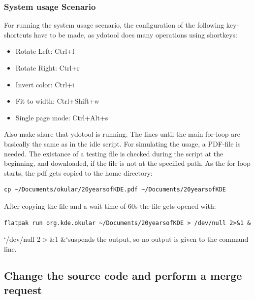     \subsubsection{System usage Scenario}
    For running the system usage scenario, the configuration of the following key-shortcuts have to be made, as ydotool does many operations using shortkeys:
    \begin{itemize}
        \item Rotate Left: Ctrl+l
        \item Rotate Right: Ctrl+r
        \item Invert color: Ctrl+i
        \item Fit to width: Ctrl+Shift+w
        \item Single page mode: Ctrl+Alt+s
    \end{itemize}
    Also make shure that ydotool is running.
    The lines until the main for-loop are basically the same as in the idle script. For simulating the usage, a PDF-file is needed. The existance of a testing file is checked during the script at the beginning, and downloaded, if the file is not at the specified path. As the for loop starts, the pdf gets copied to the home directory:
    \begin{lstlisting}[gobble=8]
        cp ~/Documents/okular/20yearsofKDE.pdf ~/Documents/20yearsofKDE
    \end{lstlisting}
    After copying the file and a wait time of 60s the file gets opened with:
    \begin{lstlisting}[gobble=8]
        flatpak run org.kde.okular ~/Documents/20yearsofKDE > /dev/null 2>&1 &
    \end{lstlisting}
    `/dev/null 2$>$\&1 \&`suspends the output, so no output is given to the command line.

    \subsection{Change the source code and perform a merge request}